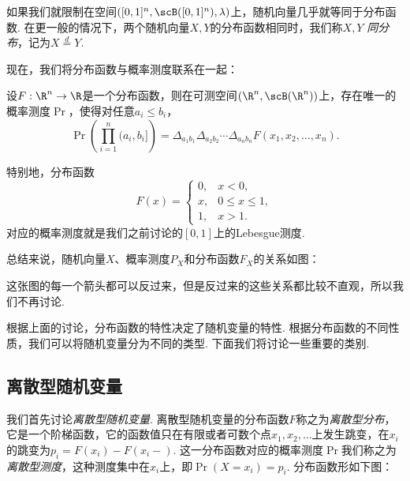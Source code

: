 如果我们就限制在空间$([0,1]^n,\scB([0,1]^n),\lambda)$上，随机向量几乎就等同于分布函数. 在更一般的情况下，两个随机向量$X,Y$的分布函数相同时，我们称$X,Y$ \emph{同分布}，记为$X \stackrel{d}{=} Y$.

现在，我们将分布函数与概率测度联系在一起：

\begin{theorem}\label{thm:uniqueness-of-distribution-function}
设$F:\R^n\to\R$是一个分布函数，则在可测空间$(\R^n,\scB(\R^n))$上，存在唯一的概率测度$\Pr$，使得对任意$a_i\leq b_i$，
\[
    \Pr\left(\prod_{i=1}^n(a_i,b_i]\right) = \Delta_{a_1b_1}\Delta_{a_2b_2}\cdots\Delta_{a_nb_n}F(x_1,x_2,\ldots,x_n).
\]
\end{theorem}

特别地，分布函数
\[F(x)=\begin{cases}
    0,&x<0,\\
    x,&0\leq x\leq 1,\\
    1,&x>1.
\end{cases}\]
对应的概率测度就是我们之前讨论的$[0,1]$上的Lebesgue测度.

总结来说，随机向量$X$、概率测度$P_X$和分布函数$F_X$的关系如图：
\begin{center}
\end{center}

这张图的每一个箭头都可以反过来，但是反过来的这些关系都比较不直观，所以我们不再讨论. 

根据上面的讨论，分布函数的特性决定了随机变量的特性. 根据分布函数的不同性质，我们可以将随机变量分为不同的类型. 下面我们将讨论一些重要的类别. 

\subsection{离散型随机变量}

我们首先讨论\emph{离散型随机变量}. 离散型随机变量的分布函数$F$称之为\emph{离散型分布}，它是一个阶梯函数，它的函数值只在有限或者可数个点$x_1,x_2,\dots$上发生跳变，在$x_i$的跳变为$p_i=F(x_i)-F(x_i-)$. 这一分布函数对应的概率测度$\Pr$我们称之为\emph{离散型测度}，这种测度集中在$x_i$上，即$\Pr(X=x_i)=p_i$. 分布函数形如下图：


